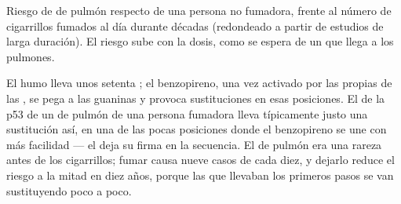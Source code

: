\begin{omfigure}

{\small Riesgo de  de pulmón respecto de una persona no fumadora,
frente al número de cigarrillos fumados al día durante décadas
(redondeado a partir de estudios de larga duración). El riesgo sube con
la dosis, como se espera de un  que llega a los pulmones.}
\end{omfigure}

\begin{example}[El tabaco]\label{ex:g11:cancer:tobacco}
El humo lleva unos setenta ; el benzopireno, una vez
activado por las propias  de las , se pega a las guaninas
y provoca sustituciones en esas posiciones. El  de la p53 de un
 de pulmón de una persona fumadora lleva típicamente justo una
sustitución así, en una de las pocas posiciones donde el benzopireno se
une con más facilidad --- el  deja su firma en la secuencia. El
 de pulmón era una rareza antes de los cigarrillos; fumar causa
nueve casos de cada diez, y dejarlo reduce el riesgo a la mitad en diez
años, porque las  que llevaban los primeros pasos se van
sustituyendo poco a poco.
\end{example}

